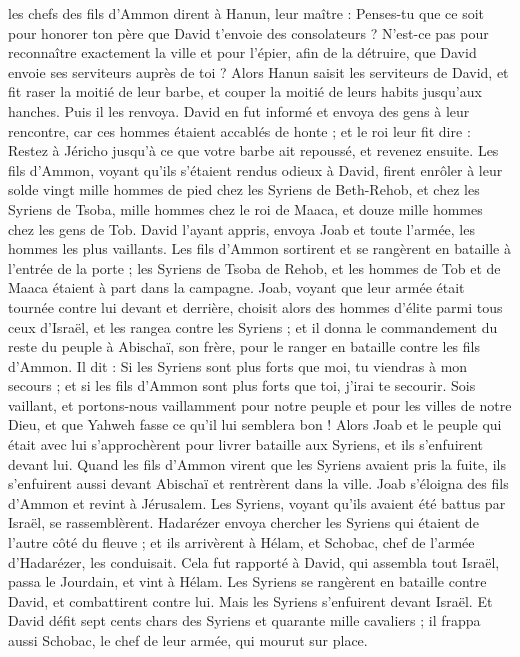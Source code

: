 \begin{multicols}{2}
les chefs des fils d'Ammon dirent à Hanun, leur maître : Penses-tu que ce soit pour honorer ton père que David t'envoie des consolateurs ? N'est-ce pas pour reconnaître exactement la ville et pour l'épier, afin de la détruire, que David envoie ses serviteurs auprès de toi ?
Alors Hanun saisit les serviteurs de David, et fit raser la moitié de leur barbe, et couper la moitié de leurs habits jusqu'aux hanches. Puis il les renvoya.
David en fut informé et envoya des gens à leur rencontre, car ces hommes étaient accablés de honte ; et le roi leur fit dire : Restez à Jéricho jusqu'à ce que votre barbe ait repoussé, et revenez ensuite.
Les fils d'Ammon, voyant qu'ils s'étaient rendus odieux à David, firent enrôler à leur solde vingt mille hommes de pied chez les Syriens de Beth-Rehob, et chez les Syriens de Tsoba, mille hommes chez le roi de Maaca, et douze mille hommes chez les gens de Tob.
David l'ayant appris, envoya Joab et toute l'armée, les hommes les plus vaillants.
Les fils d'Ammon sortirent et se rangèrent en bataille à l'entrée de la porte ; les Syriens de Tsoba de Rehob, et les hommes de Tob et de Maaca étaient à part dans la campagne.
Joab, voyant que leur armée était tournée contre lui devant et derrière, choisit alors des hommes d'élite parmi tous ceux d'Israël, et les rangea contre les Syriens ;
et il donna le commandement du reste du peuple à Abischaï, son frère, pour le ranger en bataille contre les fils d'Ammon.
Il dit : Si les Syriens sont plus forts que moi, tu viendras à mon secours ; et si les fils d'Ammon sont plus forts que toi, j'irai te secourir.
Sois vaillant, et portons-nous vaillamment pour notre peuple et pour les villes de notre Dieu, et que Yahweh fasse ce qu'il lui semblera bon !
Alors Joab et le peuple qui était avec lui s'approchèrent pour livrer bataille aux Syriens, et ils s'enfuirent devant lui.
Quand les fils d'Ammon virent que les Syriens avaient pris la fuite, ils s'enfuirent aussi devant Abischaï et rentrèrent dans la ville. Joab s'éloigna des fils d'Ammon et revint à Jérusalem.
Les Syriens, voyant qu'ils avaient été battus par Israël, se rassemblèrent.
Hadarézer envoya chercher les Syriens qui étaient de l'autre côté du fleuve ; et ils arrivèrent à Hélam, et Schobac, chef de l'armée d'Hadarézer, les conduisait.
Cela fut rapporté à David, qui assembla tout Israël, passa le Jourdain, et vint à Hélam. Les Syriens se rangèrent en bataille contre David, et combattirent contre lui.
Mais les Syriens s'enfuirent devant Israël. Et David défit sept cents chars des Syriens et quarante mille cavaliers ; il frappa aussi Schobac, le chef de leur armée, qui mourut sur place.

\end{multicols}
